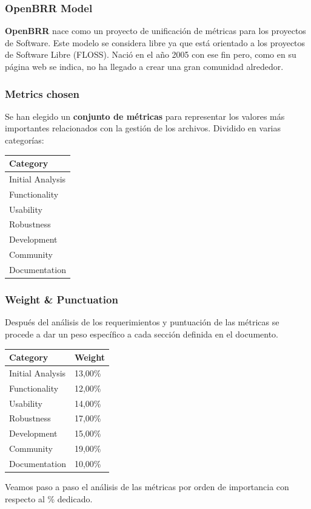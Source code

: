 \documentclass[xcolor=dvipsnames]{beamer}
\begin{document}
\begin{frame}[allowframebreaks]
\frametitle{OpenBRR Model}

\textbf{OpenBRR} nace como un proyecto de unificaci\'on de m\'etricas para los proyectos de Software. Este modelo se considera libre ya que est\'a orientado a los proyectos de Software Libre (FLOSS). Naci\'o en el a\~no 2005 con ese fin pero, como en su p\'agina web se indica, no ha llegado a crear una gran comunidad alrededor.

\end{frame}

\begin{frame}[allowframebreaks]
\frametitle{Metrics chosen}

Se han elegido un \textbf{conjunto de m\'etricas} para representar los valores m\'as importantes relacionados con la gesti\'on de los archivos. Dividido en varias categor\'ias:

\begin{tabular}{|l|}
    \hline {\bf Category}\\
    \hline Initial Analysis\\
    \hline Functionality\\
    \hline Usability\\
    \hline Robustness\\
    \hline Development\\
    \hline Community\\
    \hline Documentation\\
    \hline
\end{tabular}

\end{frame}

\begin{frame}[allowframebreaks]
\frametitle{Weight \& Punctuation}

\par Despu\'es del an\'alisis de los requerimientos y puntuaci\'on de las m\'etricas se procede a dar un peso espec\'ifico a cada secci\'on definida en el documento.

\begin{tabular}{|l|l|}
    \hline {\bf Category} & {\bf Weight}\\
    \hline Initial Analysis	 & 13,00\%\\
    \hline Functionality & 12,00\%\\
    \hline Usability & 14,00\%\\
    \hline Robustness & 17,00\%\\
    \hline Development & 15,00\%\\
    \hline Community & 19,00\%\\
    \hline Documentation & 10,00\%\\
    \hline
\end{tabular}

Veamos paso a paso el an\'alisis de las m\'etricas por orden de importancia con respecto al \% dedicado.

\end{frame}
\end{document}

